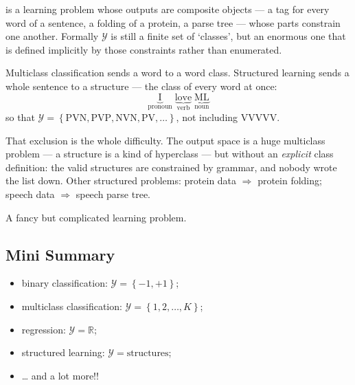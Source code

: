 \begin{definition}\label{def:structured}
     is a learning problem whose outputs are
    composite objects --- a tag for every word of a sentence, a folding of a
    protein, a parse tree --- whose parts constrain one another. Formally
    \(\mathcal{Y}\) is still a finite set of `classes', but an enormous one that
    is defined implicitly by those constraints rather than enumerated.
\end{definition}

\begin{eg}
    Multiclass classification sends a word to a word class. Structured
    learning sends a whole sentence to a structure --- the class of every word
    at once:
    \[
        \underbrace{\text{I}}_{\text{pronoun}} \;
        \underbrace{\text{love}}_{\text{verb}} \;
        \underbrace{\text{ML}}_{\text{noun}}
    \]
    so that \(\mathcal{Y} = \left\{ \mathrm{PVN}, \mathrm{PVP}, \mathrm{NVN},
    \mathrm{PV}, \dots \right\}\), not including \(\mathrm{VVVVV}\).
\end{eg}

That exclusion is the whole difficulty. The output space is a huge multiclass
problem --- a structure is a kind of hyperclass --- but without an
\emph{explicit} class definition: the valid structures are constrained by
grammar, and nobody wrote the list down. Other structured problems: protein data
\(\Rightarrow\) protein folding; speech data \(\Rightarrow\) speech parse tree.

\begin{moral}
    A fancy but complicated learning problem.
\end{moral}

\subsection{Mini Summary}

\begin{note}
    \hfill
    \begin{itemize}
        \item binary classification: \(\mathcal{Y} = \left\{ -1, +1 \right\}\);
        \item multiclass classification:
            \(\mathcal{Y} = \left\{ 1, 2, \dots , K \right\}\);
        \item regression: \(\mathcal{Y} = \mathbb{R}\);
        \item structured learning: \(\mathcal{Y} = \text{structures}\);
        \item \ldots{} and a lot more!!
    \end{itemize}
\end{note}

